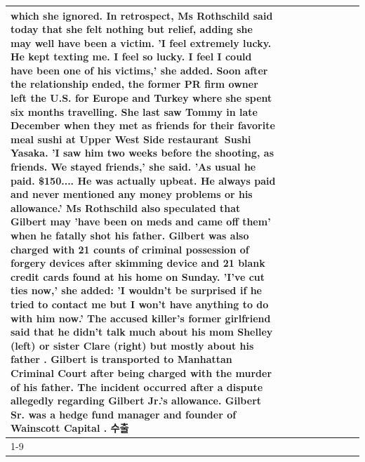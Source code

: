 \begin{table}[H]
\begin{tabular}{lllrlllll}
which she ignored. In retrospect, Ms Rothschild said today that she felt nothing but relief, adding she may well have been a victim. 'I feel extremely lucky. He kept texting me. I feel so lucky. I feel I could have been one of his victims,' she added. Soon after the relationship ended, the former PR firm owner left the U.S. for Europe and Turkey where she spent six months  travelling. She last saw Tommy in late December when they met as friends for their favorite meal sushi at Upper West Side restaurant Sushi Yasaka. 'I saw him two weeks before the shooting, as friends. We stayed friends,' she said. 'As usual he paid. \$150.... He was actually upbeat. He always paid and never mentioned any money problems or his allowance.' Ms Rothschild also speculated that Gilbert may 'have been on meds and came off them' when he fatally shot his father. Gilbert was also charged with 21 counts of criminal possession of forgery devices after skimming device and 21 blank credit cards found at his home on Sunday. 'I've cut ties now,' she added: 'I wouldn’t be surprised if he tried to contact me but I won’t have anything to do with him now.' The accused killer's former girlfriend said that he didn't talk much about his mom Shelley (left) or sister Clare (right) but mostly about his father . Gilbert is transported to Manhattan Criminal Court  after being charged with the murder of his father. The incident occurred after a dispute allegedly regarding Gilbert Jr.'s allowance. Gilbert Sr. was a hedge fund manager and founder of Wainscott Capital . 수출 \\
\cline{1-9}

\end{tabular}
\end{table}
